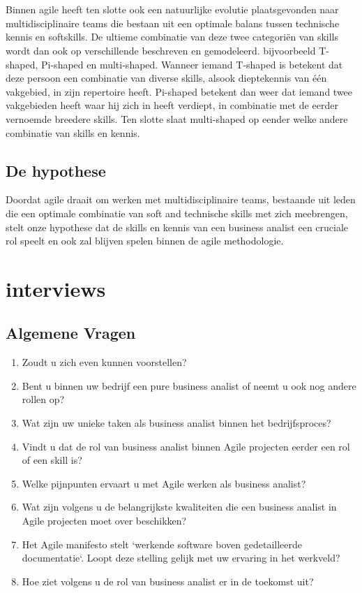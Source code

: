 \documentclass{hogent-article}
\begin{document}
\\~~\\
Binnen agile heeft ten slotte ook een natuurlijke evolutie plaatsgevonden naar multidisciplinaire teams die bestaan uit een optimale balans tussen technische kennis en softskills. De ultieme combinatie van deze twee categoriën van skills wordt dan ook op verschillende beschreven en gemodeleerd. bijvoorbeeld T-shaped, Pi-shaped en multi-shaped. Wanneer iemand T-shaped is betekent dat deze persoon een combinatie van diverse skills, alsook dieptekennis van één vakgebied, in zijn repertoire heeft. Pi-shaped betekent dan weer dat iemand twee vakgebieden heeft waar hij zich in heeft verdiept, in combinatie met de eerder vernoemde breedere skills. Ten slotte slaat multi-shaped op eender welke andere combinatie van skills en kennis.\autocite{heijnerelevante}

\subsection{De hypothese}

Doordat agile draait om werken met multidisciplinaire teams, bestaande uit leden die een optimale combinatie van soft and technische skills met zich meebrengen, stelt onze hypothese dat de skills en kennis van een business analist een cruciale rol speelt en ook zal blijven spelen binnen de agile methodologie.

\newpage

\section{interviews}
\subsection{Algemene Vragen}

\begin{enumerate}
  \item Zoudt u zich even kunnen voorstellen?
  \item Bent u binnen uw bedrijf een pure business analist of neemt u ook nog andere rollen op?
  \item Wat zijn uw unieke taken als business analist binnen het bedrijfsproces?
  \item Vindt u dat de rol van business analist binnen Agile projecten eerder een rol of een skill is?
  \item Welke pijnpunten ervaart u met Agile werken als business analist?
  \item Wat zijn volgens u de belangrijkste kwaliteiten die een business analist in Agile projecten moet over beschikken?
  \item Het Agile manifesto stelt `werkende software boven gedetailleerde documentatie`. Loopt deze stelling gelijk met uw ervaring in het werkveld?
  \item Hoe ziet volgens u de rol van business analist er in de toekomst uit?
\end{enumerate}
\end{document}
